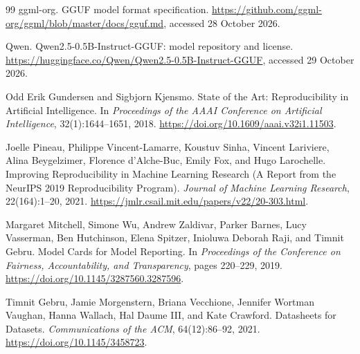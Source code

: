 \documentclass[11pt,a4paper]{article}
\begin{document}
\begin{thebibliography}{99}
ggml-org.
\newblock GGUF model format specification.
\newblock \url{https://github.com/ggml-org/ggml/blob/master/docs/gguf.md}, accessed 28 October 2026.

Qwen.
\newblock Qwen2.5-0.5B-Instruct-GGUF: model repository and license.
\newblock \url{https://huggingface.co/Qwen/Qwen2.5-0.5B-Instruct-GGUF}, accessed 29 October 2026.

Odd Erik Gundersen and Sigbjorn Kjensmo.
\newblock State of the Art: Reproducibility in Artificial Intelligence.
\newblock In \emph{Proceedings of the AAAI Conference on Artificial Intelligence}, 32(1):1644--1651, 2018.
\newblock \url{https://doi.org/10.1609/aaai.v32i1.11503}.

Joelle Pineau, Philippe Vincent-Lamarre, Koustuv Sinha, Vincent Lariviere, Alina Beygelzimer, Florence d'Alche-Buc, Emily Fox, and Hugo Larochelle.
\newblock Improving Reproducibility in Machine Learning Research (A Report from the NeurIPS 2019 Reproducibility Program).
\newblock \emph{Journal of Machine Learning Research}, 22(164):1--20, 2021.
\newblock \url{https://jmlr.csail.mit.edu/papers/v22/20-303.html}.

Margaret Mitchell, Simone Wu, Andrew Zaldivar, Parker Barnes, Lucy Vasserman, Ben Hutchinson, Elena Spitzer, Inioluwa Deborah Raji, and Timnit Gebru.
\newblock Model Cards for Model Reporting.
\newblock In \emph{Proceedings of the Conference on Fairness, Accountability, and Transparency}, pages 220--229, 2019.
\newblock \url{https://doi.org/10.1145/3287560.3287596}.

Timnit Gebru, Jamie Morgenstern, Briana Vecchione, Jennifer Wortman Vaughan, Hanna Wallach, Hal Daume III, and Kate Crawford.
\newblock Datasheets for Datasets.
\newblock \emph{Communications of the ACM}, 64(12):86--92, 2021.
\newblock \url{https://doi.org/10.1145/3458723}.

\end{thebibliography}
\end{document}

